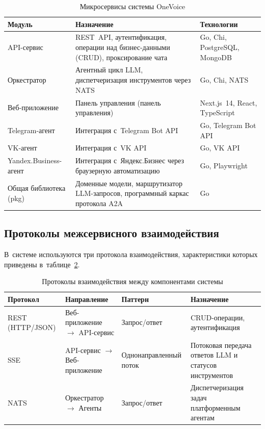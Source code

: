 \begin{table}[H]
  \caption{Микросервисы системы OneVoice}
  \label{tab:services}
  \small
  \begin{tabularx}{\textwidth}{|p{3cm}|X|p{3.5cm}|}
    \hline
    \textbf{Модуль} & \textbf{Назначение} & \textbf{Технологии} \\
    \hline
    API-сервис & REST~API, аутентификация, операции над бизнес-данными (CRUD), проксирование чата & Go, Chi, PostgreSQL, MongoDB \\
    \hline
    Оркестратор & Агентный цикл LLM, диспетчеризация инструментов через NATS & Go, Chi, NATS \\
    \hline
    Веб-приложение & Панель управления (панель управления) & Next.js~14, React, TypeScript \\
    \hline
    Telegram-агент & Интеграция с~Telegram Bot API & Go, Telegram Bot API \\
    \hline
    VK-агент & Интеграция с~VK API & Go, VK API \\
    \hline
    Yandex.Business-агент & Интеграция с~Яндекс.Бизнес через браузерную автоматизацию & Go, Playwright \\
    \hline
    Общая библиотека (pkg) & Доменные модели, маршрутизатор LLM-запросов, программный каркас протокола A2A & Go \\
    \hline
  \end{tabularx}
\end{table}

\subsection{Протоколы межсервисного взаимодействия}
\label{subsec:protocols-impl}

В~системе используются три протокола взаимодействия, характеристики которых приведены в~таблице~\ref{tab:protocols}.

\begin{table}[H]
  \caption{Протоколы взаимодействия между компонентами системы}
  \label{tab:protocols}
  \small
  \begin{tabularx}{\textwidth}{|p{2.5cm}|p{3.5cm}|p{2.5cm}|X|}
    \hline
    \textbf{Протокол} & \textbf{Направление} & \textbf{Паттерн} & \textbf{Назначение} \\
    \hline
    REST (HTTP/JSON) & Веб-приложение $\rightarrow$ API-сервис & Запрос/ответ & CRUD-операции, аутентификация \\
    \hline
    SSE & API-сервис $\rightarrow$ Веб-приложение & Однонаправленный поток & Потоковая передача ответов LLM и статусов инструментов \\
    \hline
    NATS & Оркестратор $\rightarrow$ Агенты & Запрос/ответ & Диспетчеризация задач платформенным агентам \\
    \hline
  \end{tabularx}
\end{table}

